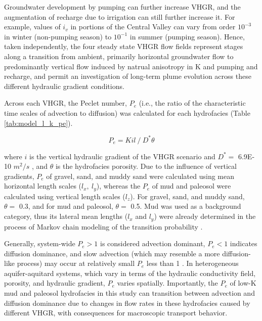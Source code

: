 Groundwater development by pumping can further increase VHGR, and the augmentation of recharge due to irrigation can still further increase it. For example, values of $i_v$ in portions of the Central Valley can vary from order $10^{-3}$ in winter (non-pumping season) to $10^{-1}$ in summer (pumping season). Hence, taken independently, the four steady state VHGR flow fields represent stages along a transition from ambient, primarily horizontal groundwater flow to predominantly vertical flow induced by natrual anisotropy in K and pumping and recharge, and permit an investigation of long-term plume evolution across these different hydraulic gradient conditions. 


Across each VHGR, the Peclet number, $P_e$ (i.e., the ratio of the characteristic time scales of advection to diffusion) was calculated for each hydrofacies (Table \ref{tab:model_l_k_pe}).

\begin{equation}
    P_e = K i l \: / \: D^* \theta
\label{eq:pe}
\end{equation}

where $i$ is the vertical hydraulic gradient of the VHGR scenario and $D^* =$ 6.9E-10 $m^2/s$ \citep{weissmann2004influence, weissmann2002modeling}, and $\theta$ is the hydrofacies porosity. Due to the influence of vertical gradients, $P_e$ of gravel, sand, and muddy sand were calculated using mean horizontal length scales ($l_x, \: l_y$), whereas the $P_e$ of mud and paleosol were calculated using vertical length scales ($l_z$). For gravel, sand, and muddy sand, $\theta =$ 0.3, and for mud and paleosol, $\theta =$ 0.5. Mud was used as a background category, thus its lateral mean lengths ($l_x$ and $l_y$) were already determined in the process of Markov chain modeling of the transition probability \citep{weissmann1999three}.


Generally, system-wide $P_e > 1$ is considered advection dominant, $P_e < 1$ indicates diffusion dominance, and slow advection (which may resemble a more diffusion-like process) may occur at relatively small $P_e$ less than 1 \citep{guswa2000slow}. In heterogeneous aquifer-aquitard systems, which vary in terms of the hydraulic conductivity field, porosity, and hydraulic gradient, $P_e$ varies spatially. Importantly, the $P_e$ of low-K mud and paleosol hydrofacies in this study can transition between advection and diffusion dominance due to changes in flow rates in these hydrofacies caused by different VHGR, with consequences for macroscopic transport behavior. 






